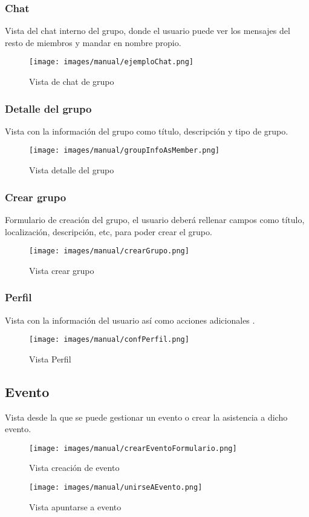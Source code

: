 \subsubsection{Chat}
Vista del chat interno del grupo, donde el usuario puede ver los mensajes del resto de miembros y mandar en nombre propio.
\begin{figure}[H]
        \centering
        \texttt{[image: images/manual/ejemploChat.png]}
        \caption{Vista de chat de grupo}
        \label{fig:Vista chat grupo}
\end{figure}
\subsubsection{Detalle del grupo}
Vista con la información del grupo como título, descripción y tipo de grupo.
\begin{figure}[H]
        \centering
        \texttt{[image: images/manual/groupInfoAsMember.png]}
        \caption{Vista detalle del grupo}
        \label{fig:Vista detalle del grupo}
\end{figure}
\subsubsection{Crear grupo}
Formulario de creación del grupo, el usuario deberá rellenar campos como título, localización, descripción, etc, para poder crear el grupo.
\begin{figure}[H]
        \centering
        \texttt{[image: images/manual/crearGrupo.png]}
        \caption{Vista crear grupo}
        \label{fig:Vista Crear Grupo}
\end{figure}
\subsubsection{Perfil}
Vista con la información del usuario así como acciones adicionales .
\begin{figure}[H]
        \centering
        \texttt{[image: images/manual/confPerfil.png]}
        \caption{Vista Perfil}
        \label{fig:Vista Perfil}
\end{figure}

\subsection{Evento}
Vista desde la que se puede gestionar un evento o crear la asistencia a dicho evento.
\begin{figure}[H]
        \centering
        \texttt{[image: images/manual/crearEventoFormulario.png]}
        \caption{Vista creación de evento}
        \label{fig:Eventos}
\end{figure}
\begin{figure}[H]
        \centering
        \texttt{[image: images/manual/unirseAEvento.png]}
        \caption{Vista apuntarse a evento}
        \label{fig:Vista unirse evento}
\end{figure}

